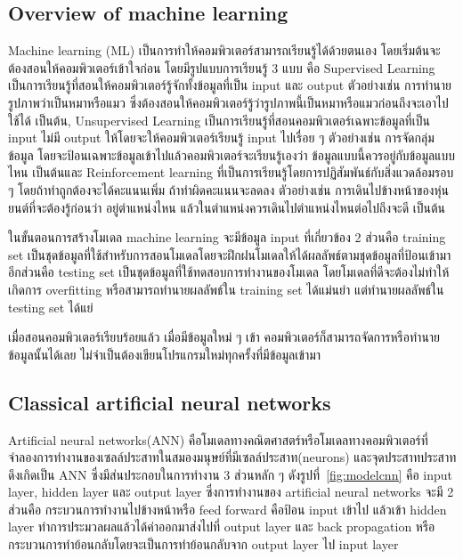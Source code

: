 \documentclass[12pt,oneside,openright,a4paper]{cpe-thai-project}
\begin{document}
\subsection{Overview of machine learning}
\par\setlength{\parindent}{5ex}Machine learning (ML) เป็นการทำให้คอมพิวเตอร์สามารถเรียนรู้ได้ด้วยตนเอง โดยเริ่มต้นจะต้องสอนให้คอมพิวเตอร์เข้าใจก่อน โดยมีรูปแบบการเรียนรู้ 3 แบบ คือ  Supervised Learning เป็นการเรียนรู้ที่สอนให้คอมพิวเตอร์รู้จักทั้งข้อมูลที่เป็น input และ output ตัวอย่างเช่น การทำนายรูปภาพว่าเป็นหมาหรือแมว ซึ่งต้องสอนให้คอมพิวเตอร์รู้ว่ารูปภาพนี้เป็นหมาหรือแมวก่อนถึงจะเอาไปใช้ได้ เป็นต้น, Unsupervised Learning เป็นการเรียนรู้ที่สอนคอมพิวเตอร์เฉพาะข้อมูลที่เป็น input ไม่มี output ให้โดยจะให้คอมพิวเตอร์เรียนรู้ input ไปเรื่อย ๆ ตัวอย่างเช่น การจัดกลุ่มข้อมูล โดยจะป้อนเฉพาะข้อมูลเข้าไปแล้วคอมพิวเตอร์จะเรียนรู้เองว่า ข้อมูลแบบนี้ควรอยู่กับข้อมูลแบบไหน เป็นต้นและ Reinforcement learning ที่เป็นการเรียนรู้โดยการปฏิสัมพันธ์กับสิ่งแวดล้อมรอบ ๆ โดยถ้าทำถูกต้องจะได้คะแนนเพิ่ม ถ้าทำผิดคะแนนจะลดลง ตัวอย่างเช่น การเดินไปข้างหน้าของหุ่นยนต์ที่จะต้องรู้ก่อนว่า อยู่ตำแหน่งไหน แล้วในตำแหน่งควรเดินไปตำแหน่งไหนต่อไปถึงจะดี เป็นต้น
\par\setlength{\parindent}{5ex}ในขั้นตอนการสร้างโมเดล machine learning จะมีข้อมูล input ที่เกี่ยวข้อง 2 ส่วนคือ training set เป็นชุดข้อมูลที่ใช้สำหรับการสอนโมเดลโดยจะฝึกฝนโมเดลให้ได้ผลลัพธ์ตามชุดข้อมูลที่ป้อนเข้ามา อีกส่วนคือ testing set เป็นชุดข้อมูลที่ใช้ทดสอบการทำงานของโมเดล โดยโมเดลที่ดีจะต้องไม่ทำให้เกิดการ overfitting หรือสามารถทำนายผลลัพธ์ใน training set ได้แม่นยำ แต่ทำนายผลลัพธ์ใน testing set ได้แย่ 
\par\setlength{\parindent}{5ex}เมื่อสอนคอมพิวเตอร์เรียบร้อยแล้ว เมื่อมีข้อมูลใหม่ ๆ เข้า คอมพิวเตอร์ก็สามารถจัดการหรือทำนายข้อมูลนั้นได้เลย ไม่จำเป็นต้องเขียนโปรแกรมใหม่ทุกครั้งที่มีข้อมูลเข้ามา

\subsection{Classical artificial neural networks}
\par\setlength{\parindent}{5ex}
Artificial neural networks(ANN) คือโมเดลทางคณิตศาสตร์หรือโมเดลทางคอมพิวเตอร์ที่จำลองการทำงานของเซลล์ประสาทในสมองมนุษย์ที่มีเซลล์ประสาท(neurons) และจุดประสาทประสาท  ดึงเกิดเป็น ANN ซึ่งมีส่นประกอบในการทำงาน 3 ส่วนหลัก ๆ ดังรูปที่~\ref{fig:modelcnn} คือ input layer, hidden layer และ output layer ซึ่งการทำงานของ artificial neural networks จะมี 2 ส่วนคือ กระบวนการทำงานไปข้างหน้าหรือ feed forward คือป้อน input เข้าไป แล้วเข้า hidden layer ทำการประมวลผลแล้วได้ค่าออกมาส่งไปที่ output layer และ back propagation หรือกระบวนการทำย้อนกลับโดยจะเป็นการทำย้อนกลับจาก output layer ไป input layer
\end{document}
